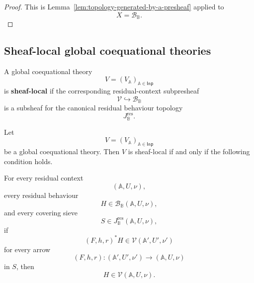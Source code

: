 \begin{proof}
    This is Lemma~\ref{lem:topology-generated-by-a-presheaf} applied to
    \[
        X=\mathcal B_{\mathbb B}.
    \]
\end{proof}

\subsection{Sheaf-local global coequational theories}
\label{subsec:sheaf-local-global-coequational-theories}

\begin{definition}
\label{def:sheaf-local-global-coequational-theory}
    A global coequational theory
    \[
        V=(V_{\mathbb A})_{\mathbb A\in\mathsf{Inp}}
    \]
    is \textbf{sheaf-local} if the corresponding residual-context subpresheaf
    \[
        \mathcal V\hookrightarrow\mathcal B_{\mathbb B}
    \]
    is a subsheaf for the canonical residual behaviour topology
    \[
        J_{\mathbb B}^{\mathrm{res}}.
    \]
\end{definition}

\begin{lemma}
\label{lem:membership-criterion-sheaf-local-theories}
    Let
    \[
        V=(V_{\mathbb A})_{\mathbb A\in\mathsf{Inp}}
    \]
    be a global coequational theory. Then \(V\) is sheaf-local if and only if
    the following condition holds.

    For every residual context
    \[
        (\mathbb A,U,\nu),
    \]
    every residual behaviour
    \[
        H\in\mathcal B_{\mathbb B}(\mathbb A,U,\nu),
    \]
    and every covering sieve
    \[
        S\in J_{\mathbb B}^{\mathrm{res}}(\mathbb A,U,\nu),
    \]
    if
    \[
        (F,h,r)^*H
        \in
        \mathcal V(\mathbb A',U',\nu')
    \]
    for every arrow
    \[
        (F,h,r):
        (\mathbb A',U',\nu')
        \to
        (\mathbb A,U,\nu)
    \]
    in \(S\), then
    \[
        H\in\mathcal V(\mathbb A,U,\nu).
    \]
\end{lemma}

